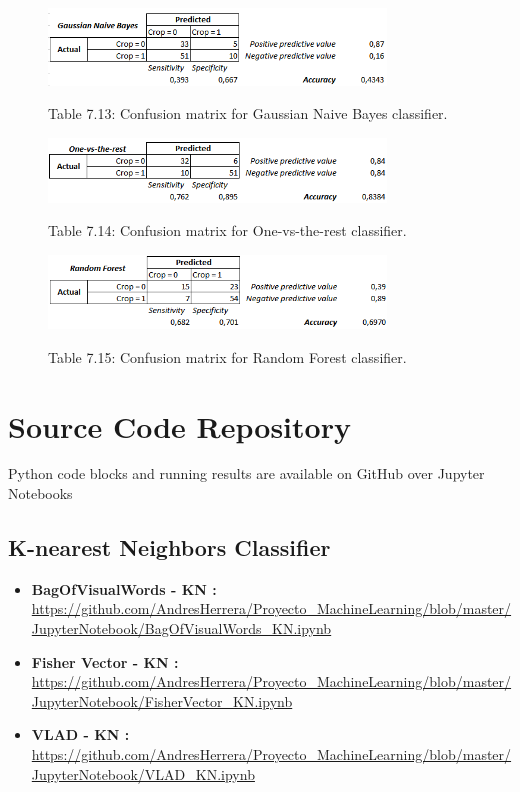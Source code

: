 \documentclass[12pt]{article}
\numberwithin{equation}{section}
\numberwithin{table}{section}
\numberwithin{figure}{section}
\begin{document}
\begin{figure}[H] \centering
	\caption*{Table 7.13: Confusion matrix for Gaussian Naive Bayes classifier. }
	\includegraphics[width=0.8\textwidth]{m13.png}
	\label{m13}
\end{figure}

\begin{figure}[H] \centering
	\caption*{Table 7.14: Confusion matrix for One-vs-the-rest classifier. }
	\includegraphics[width=0.8\textwidth]{m14.png}
	\label{m14}
\end{figure}

\begin{figure}[H] \centering
	\caption*{Table 7.15: Confusion matrix for Random Forest classifier. }
	\includegraphics[width=0.8\textwidth]{m15.png}
	\label{m15}
\end{figure}




\section{Source Code Repository}

Python code blocks and running results are available on GitHub over Jupyter Notebooks

\subsection{K-nearest Neighbors Classifier }

\begin{itemize}
	\item {\textbf{BagOfVisualWords - KN :} } \url{https://github.com/AndresHerrera/Proyecto_MachineLearning/blob/master/JupyterNotebook/BagOfVisualWords_KN.ipynb}
	
	\item {\textbf{Fisher Vector - KN :} } \url{	https://github.com/AndresHerrera/Proyecto_MachineLearning/blob/master/JupyterNotebook/FisherVector_KN.ipynb}
	
	\item {\textbf{VLAD - KN :} } \url{	https://github.com/AndresHerrera/Proyecto_MachineLearning/blob/master/JupyterNotebook/VLAD_KN.ipynb}
		
\end{itemize}
\end{document}
